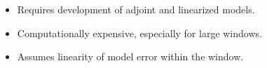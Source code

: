 \documentclass[a4paper]{article}
\begin{document}
\begin{itemize}
  \item Requires development of adjoint and linearized models.
  \item Computationally expensive, especially for large windows.
  \item Assumes linearity of model error within the window.
\end{itemize}

\end{document}

